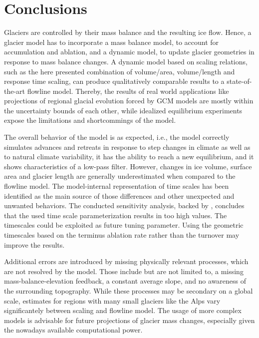 \chapter{Conclusions}\label{chap:conclusions}
\thispagestyle{plain}


Glaciers are controlled by their mass balance and the resulting ice flow. Hence, a glacier model has to incorporate a mass balance model, to account for accumulation and ablation, and a dynamic model, to update glacier geometries in response to mass balance changes. A dynamic model based on scaling relations, such as the here presented combination of volume/area, volume/length and response time scaling, can produce qualitatively comparable results to a state-of-the-art flowline model. Thereby, the results of real world applications like projections of regional glacial evolution forced by GCM models are mostly within the uncertainty bounds of each other, while idealized equilibrium experiments expose the limitations and shortcommings of the \vas{} model.

The overall behavior of the \vas{} model is as expected, i.e., the model correctly simulates advances and retreats in response to step changes in climate as well as to natural climate variability, it has the ability to reach a new equilibrium, and it shows characteristics of a low-pass filter. However, changes in ice volume, surface area and glacier length are generally underestimated when compared to the flowline model. The model-internal representation of time scales has been identified as the main source of those differences and other unexpected and unwanted behaviors. The conducted sensitivity analysis, backed by \citet{Roe2020}, concludes that the used time scale parameterization results in too high values. The timescales could be exploited as future tuning parameter. Using the geometric timescales based on the terminus ablation rate \citep{Johannesson1989} rather than the turnover may improve the results.

Additional errors are introduced by missing physically relevant processes, which are not resolved by the \vas{} model. Those include but are not limited to, a missing mass-balance-elevation feedback, a constant average slope, and no awareness of the surrounding topography. While these processes may be secondary on a global scale, estimates for regions with many small glaciers like the Alps vary significantely between scaling and flowline model. The usage of more complex models is advisable for future projections of glacier mass changes, especially given the nowadays available computational power.


